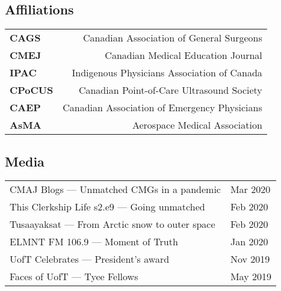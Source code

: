 \documentclass[a4paper,10pt,oneside,onecolumn,draft]{article} %
\begin{document}
\begin{multicols}{2}
\subsection*{Affiliations}
\begin{supertabular}{a@{\SubVRule}D}
  {\bfseries CAGS}&{Canadian Association of General Surgeons}\\%
  {\bfseries CMEJ}&{Canadian Medical Education Journal}\\%
  {\bfseries IPAC}&{Indigenous Physicians Association of Canada}\\
  {\bfseries CPoCUS}&{Canadian Point-of-Care Ultrasound Society}\\
  {\bfseries CAEP}&{Canadian Association of Emergency Physicians}\\
  {\bfseries AsMA}&{Aerospace Medical Association}\\
  \end{supertabular}
  \vfill
  
  \subsection*{Media}
  \begin{supertabular}{E@{\VRule}z}
  {CMAJ Blogs --- }{Unmatched CMGs in a pandemic}&Mar 2020\\%
  {This Clerkship Life s2.e9 --- }{Going unmatched}&Feb 2020\\
  {Tusaayaksat --- From Arctic snow to outer space}&Feb 2020\\
  {ELMNT FM 106.9 --- }{Moment of Truth}&Jan 2020\\
  {UofT Celebrates --- }{President's award}&Nov 2019\\
  {Faces of UofT --- }{Tyee Fellows}&May 2019\\
  \end{supertabular}
\end{multicols}

\end{document}
